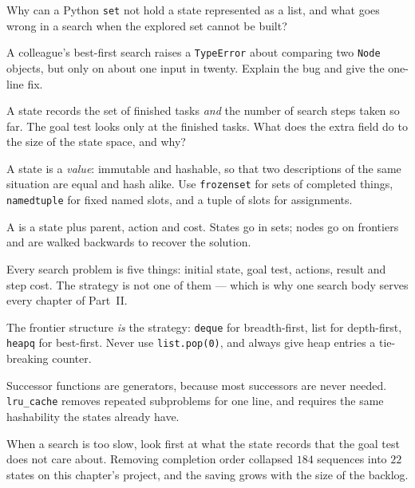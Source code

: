 \begin{checkpoint}
\begin{tightnum}
  \item Why can a Python \texttt{set} not hold a state represented as a list, and
        what goes wrong in a search when the explored set cannot be built?
  \item A colleague's best-first search raises a \texttt{TypeError} about
        comparing two \texttt{Node} objects, but only on about one input in
        twenty. Explain the bug and give the one-line fix.
  \item A state records the set of finished tasks \emph{and} the number of search
        steps taken so far. The goal test looks only at the finished tasks. What
        does the extra field do to the size of the state space, and why?
\end{tightnum}
\end{checkpoint}

\begin{chaptersummary}
\begin{tight}
  \item A state is a \emph{value}: immutable and hashable, so that two descriptions
        of the same situation are equal and hash alike. Use \texttt{frozenset} for
        sets of completed things, \texttt{namedtuple} for fixed named slots, and a
        tuple of slots for assignments.
  \item A  is a state plus parent, action and cost. States go in sets;
        nodes go on frontiers and are walked backwards to recover the solution.
  \item Every search problem is five things: initial state, goal test, actions,
        result and step cost. The strategy is not one of them --- which is why one
        search body serves every chapter of Part~II.
  \item The frontier structure \emph{is} the strategy: \texttt{deque} for
        breadth-first, list for depth-first, \texttt{heapq} for best-first. Never
        use \texttt{list.pop(0)}, and always give heap entries a tie-breaking
        counter.
  \item Successor functions are generators, because most successors are never
        needed. \texttt{lru\_cache} removes repeated subproblems for one line, and
        requires the same hashability the states already have.
  \item When a search is too slow, look first at what the state records that the
        goal test does not care about. Removing completion order collapsed $184$
        sequences into $22$ states on this chapter's project, and the saving grows
        with the size of the backlog.
\end{tight}
\end{chaptersummary}

